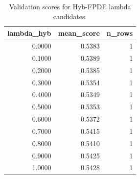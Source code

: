\begin{table}[t]
\caption{Validation scores for Hyb-FPDE lambda candidates.}
\label{tab:lambda_distribution_computed}
\centering
\begin{tabular}{rrr}
\toprule
lambda\_hyb & mean\_score & n\_rows \\
\midrule
0.0000 & 0.5383 & 1 \\
0.1000 & 0.5389 & 1 \\
0.2000 & 0.5385 & 1 \\
0.3000 & 0.5354 & 1 \\
0.4000 & 0.5349 & 1 \\
0.5000 & 0.5353 & 1 \\
0.6000 & 0.5372 & 1 \\
0.7000 & 0.5415 & 1 \\
0.8000 & 0.5410 & 1 \\
0.9000 & 0.5425 & 1 \\
1.0000 & 0.5428 & 1 \\
\bottomrule
\end{tabular}

\end{table}
